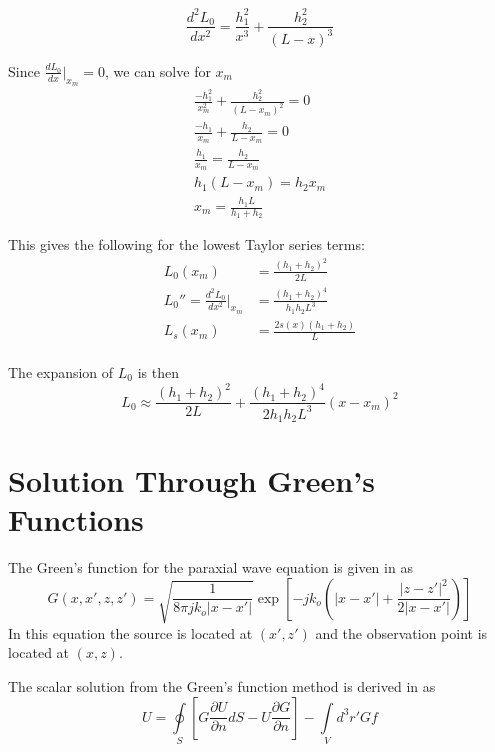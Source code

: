 \begin{equation}
\frac{d^2L_0}{dx^2} = \frac{h_1^2}{x^3} + \frac{h_2^2}{(L-x)^3} 
\label{mp_eq:16}
\end{equation}

\noindent Since $\frac{dL_0}{dx}\big|_{x_m} = 0$, we can solve for $x_m$
\begin{equation}
\begin{gathered}
\frac{-h_1^2}{x_m^2} + \frac{h_2^2}{(L-x_m)^2} = 0\\
\frac{-h_1}{x_m} + \frac{h_2}{L-x_m} = 0\\
\frac{h_1}{x_m} = \frac{h_2}{L-x_m}\\
h_1(L-x_m) = h_2x_m\\
x_m = \frac{h_1L}{h_1+h_2}
\end{gathered}
\label{mp_eq:17}
\end{equation}

\noindent This gives the following for the lowest Taylor series terms:
\begin{equation}
\begin{aligned}
L_0(x_m) &= \frac{(h_1+h_2)^2}{2L} \\
L_0''=\frac{d^2L_0}{dx^2}\bigg|_{x_m}  &= \frac{(h_1+h_2)^4}{h_1h_2L^3} \\
L_s(x_m) &= \frac{2s(x)(h_1 + h_2)}{L}\\
\end{aligned}
\label{mp_eq:17a}
\end{equation}

\noindent The expansion of $L_0$ is then
\begin{equation}
L_0 \approx \frac{(h_1+h_2)^2}{2L} + \frac{(h_1+h_2)^4}{2h_1h_2L^3}(x-x_m)^2
\label{mp_eq:18}
\end{equation}

\section{Solution Through Green's Functions}
The Green's function for the paraxial wave equation is given in \cite{frazier_green} as
\begin{equation}
G\left(x,x',z,z' \right)= \sqrt{\frac{1}{8\pi jk_o|x-x'|}}\exp\left[-jk_o\left(|x -x'| + \frac{|z-z'|^2}{2|x-x'|}\right) \right]
\label{mp_eq:11aa}
\end{equation}
\renewcommand{\baselinestretch}{2} \small\normalsize
In this equation the source is located at $(x',z')$ and the observation point is located at $(x,z)$.

The scalar solution from the Green's function method is derived in \cite{frazier_green} as
\begin{equation}
U = \oint\limits_{S}\left[G\frac{\partial U}{\partial n}dS - U\frac{\partial G}{\partial n} \right] -\int\limits_{V}d^3r' Gf
\label{mp_eq:11aaa}
\end{equation}
\renewcommand{\baselinestretch}{2} \small\normalsize

